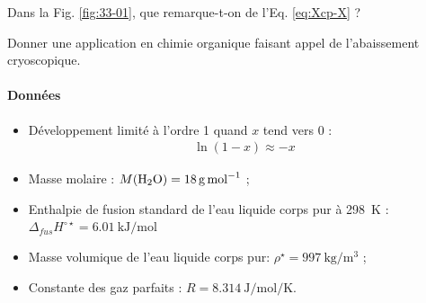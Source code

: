 \Q Dans la Fig. \ref{fig:33-01}, que remarque-t-on de l'Eq. \ref{eq:Xcp-X} ?

\Q Donner une application en chimie organique faisant appel de l'abaissement cryoscopique.

\paragraph*{Données}
\begin{itemize}
\item Développement limité à l'ordre 1 quand $x$ tend vers 0 : 
\begin{align*}
\ln (1 - x) \approx -x 
\end{align*}
\item Masse molaire : $M (\ce{H2O} ) = \SI{18}{\gram\per\mole}$ ;
\item Enthalpie de fusion standard de l'eau liquide corps pur à \SI{298}{\kelvin} : $\Delta_{fus} H^{\circ \star} = 6.01 ~ \si{\kilo\joule\per\mole}$
\item Masse volumique de l'eau liquide corps pur:  $\rho^\star = 997 ~ \si{\kilo\gram\per\meter\cubed}$ ;
\item Constante des gaz parfaits : $R = 8.314 ~ \si{\joule\per\mole\per\kelvin}$.
\end{itemize}